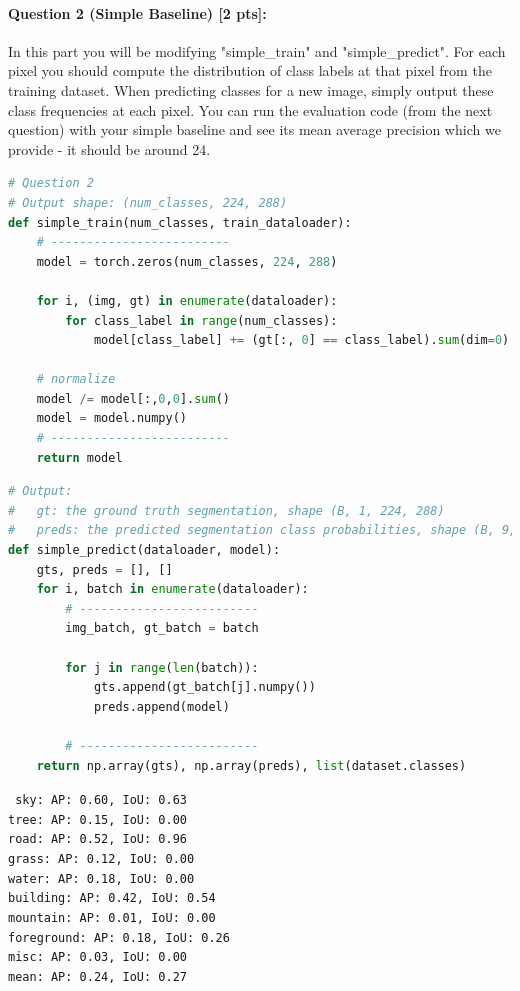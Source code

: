 \documentclass[11pt]{article}
\begin{document}
\paragraph{Question 2 (Simple Baseline) [2 pts]:} 
In this part you will be modifying "simple\_train" and "simple\_predict". For each pixel you should compute the distribution of class labels at that pixel from the training dataset. When predicting classes for a new image, simply output these class frequencies at each pixel. You can run the evaluation code (from the next question) with your simple baseline and see its mean average precision which we provide - it should be around 24.

\begin{lstlisting}[language=Python, basicstyle=\scriptsize]
# Question 2
# Output shape: (num_classes, 224, 288)
def simple_train(num_classes, train_dataloader):
    # -------------------------
    model = torch.zeros(num_classes, 224, 288)

    for i, (img, gt) in enumerate(dataloader):
        for class_label in range(num_classes):
            model[class_label] += (gt[:, 0] == class_label).sum(dim=0)

    # normalize
    model /= model[:,0,0].sum()
    model = model.numpy()
    # -------------------------
    return model
\end{lstlisting}


\begin{lstlisting}[language=Python, basicstyle=\scriptsize]
# Output:
#   gt: the ground truth segmentation, shape (B, 1, 224, 288)
#   preds: the predicted segmentation class probabilities, shape (B, 9, 224, 288) 
def simple_predict(dataloader, model):
    gts, preds = [], []
    for i, batch in enumerate(dataloader):
        # -------------------------
        img_batch, gt_batch = batch
        
        for j in range(len(batch)):
            gts.append(gt_batch[j].numpy())
            preds.append(model)
        
        # -------------------------
    return np.array(gts), np.array(preds), list(dataset.classes)
\end{lstlisting}

{\centering \tt \small
sky: AP: 0.60, IoU: 0.63 \\
tree: AP: 0.15, IoU: 0.00 \\
road: AP: 0.52, IoU: 0.96 \\
grass: AP: 0.12, IoU: 0.00 \\
water: AP: 0.18, IoU: 0.00 \\
building: AP: 0.42, IoU: 0.54 \\
mountain: AP: 0.01, IoU: 0.00 \\
foreground: AP: 0.18, IoU: 0.26 \\
misc: AP: 0.03, IoU: 0.00 \\
mean: AP: 0.24, IoU: 0.27 \\
}
\end{document}
